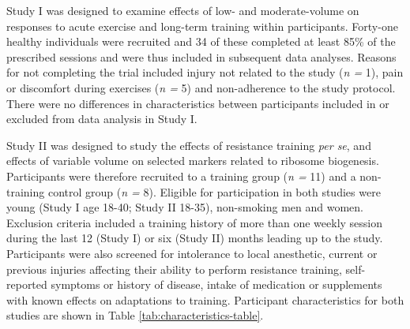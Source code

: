 \documentclass[twoside,10pt]{gihclass} %
\begin{document}
Study I was designed to examine effects of low- and moderate-volume on
responses to acute exercise and long-term training within participants.
Forty-one healthy individuals were recruited and 34 of these completed
at least 85\% of the prescribed sessions and were thus included in
subsequent data analyses. Reasons for not completing the trial included
injury not related to the study (\emph{n =} 1), pain or discomfort during
exercises (\emph{n =} 5) and non-adherence to the study protocol. There were
no differences in characteristics between participants included in or
excluded from data analysis in Study I.

Study II was designed to study the effects of resistance training \emph{per
se}, and effects of variable volume on selected markers related to
ribosome biogenesis. Participants were therefore recruited to a training
group (\emph{n =} 11) and a non-training control group (\emph{n =} 8). Eligible
for participation in both studies were young (Study I age 18-40; Study
II 18-35), non-smoking men and women. Exclusion criteria included a
training history of more than one weekly session during the last 12
(Study I) or six (Study II) months leading up to the study. Participants
were also screened for intolerance to local anesthetic, current or
previous injuries affecting their ability to perform resistance
training, self-reported symptoms or history of disease, intake of
medication or supplements with known effects on adaptations to training.
Participant characteristics for both studies are shown in Table
\ref{tab:characteristics-table}.
\end{document}
